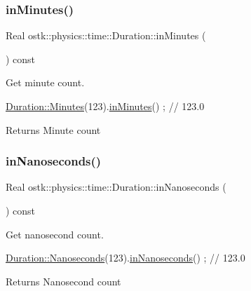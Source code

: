 \subsubsection{\texorpdfstring{in\+Minutes()}{inMinutes()}}
{\footnotesize\ttfamily Real ostk\+::physics\+::time\+::\+Duration\+::in\+Minutes (\begin{DoxyParamCaption}{ }\end{DoxyParamCaption}) const}



Get minute count. 


\begin{DoxyCode}
\hyperlink{classostk_1_1physics_1_1time_1_1_duration_a1cd2884c6bb89071780c7dffcba9b49f}{Duration::Minutes}(123).\hyperlink{classostk_1_1physics_1_1time_1_1_duration_a8ad5153d6f3ee225d9e4c32a2e19febc}{inMinutes}() ; \textcolor{comment}{// 123.0}
\end{DoxyCode}


\begin{DoxyReturn}{Returns}
Minute count 
\end{DoxyReturn}
\mbox{\label{classostk_1_1physics_1_1time_1_1_duration_a00148c707cda4dc7b93aab5280200cd5}} 
\subsubsection{\texorpdfstring{in\+Nanoseconds()}{inNanoseconds()}}
{\footnotesize\ttfamily Real ostk\+::physics\+::time\+::\+Duration\+::in\+Nanoseconds (\begin{DoxyParamCaption}{ }\end{DoxyParamCaption}) const}



Get nanosecond count. 


\begin{DoxyCode}
\hyperlink{classostk_1_1physics_1_1time_1_1_duration_a81e8036be5cf9ee2f0108ac955642c96}{Duration::Nanoseconds}(123).\hyperlink{classostk_1_1physics_1_1time_1_1_duration_a00148c707cda4dc7b93aab5280200cd5}{inNanoseconds}() ; \textcolor{comment}{// 123.0}
\end{DoxyCode}


\begin{DoxyReturn}{Returns}
Nanosecond count 
\end{DoxyReturn}
\mbox{\label{classostk_1_1physics_1_1time_1_1_duration_ab2062045cd441c3eba4d58773a7bb01b}} 
